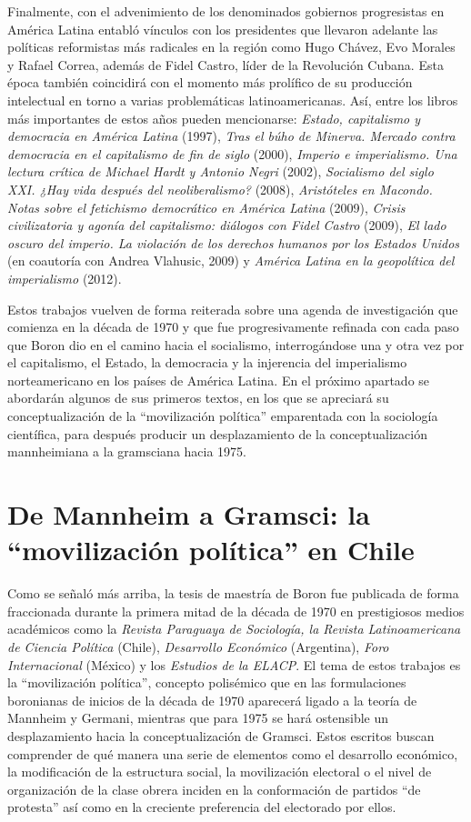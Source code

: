 Finalmente, con el advenimiento de los denominados gobiernos progresistas en América Latina entabló vínculos con los presidentes que llevaron adelante las políticas reformistas más radicales en la región como Hugo Chávez, Evo Morales y Rafael Correa, además de Fidel Castro, líder de la Revolución Cubana. Esta época también coincidirá con el momento más prolífico de su producción intelectual en torno a varias problemáticas latinoamericanas. Así, entre los libros más importantes de estos años pueden mencionarse: \emph{Estado, capitalismo y democracia en América Latina} (1997), \emph{Tras el búho de Minerva. Mercado contra democracia en el capitalismo de fin de siglo} (2000), \emph{Imperio e imperialismo. Una lectura crítica de Michael Hardt y Antonio Negri} (2002), \emph{Socialismo del siglo XXI. ¿Hay vida después del neoliberalismo?} (2008), \emph{Aristóteles en Macondo. Notas sobre el fetichismo democrático en América Latina} (2009), \emph{Crisis civilizatoria y agonía del capitalismo: diálogos con Fidel Castro} (2009), \emph{El lado oscuro del imperio. La violación de los derechos humanos por los Estados Unidos} (en coautoría con Andrea Vlahusic, 2009) y \emph{América Latina en la geopolítica del imperialismo} (2012).

Estos trabajos vuelven de forma reiterada sobre una agenda de investigación que comienza en la década de 1970 y que fue progresivamente refinada con cada paso que Boron dio en el camino hacia el socialismo, interrogándose una y otra vez por el capitalismo, el Estado, la democracia y la injerencia del imperialismo norteamericano en los países de América Latina. En el próximo apartado se abordarán algunos de sus primeros textos, en los que se apreciará su conceptualización de la ``movilización política'' emparentada con la sociología científica, para después producir un desplazamiento de la conceptualización mannheimiana a la gramsciana hacia 1975.

\section{De Mannheim a Gramsci: la ``movilización política'' en Chile}

Como se señaló más arriba, la tesis de maestría de Boron fue publicada de forma fraccionada durante la primera mitad de la década de 1970 en prestigiosos medios académicos como la \emph{Revista Paraguaya de Sociología, la Revista Latinoamericana de Ciencia Política} (Chile), \emph{Desarrollo Económico} (Argentina), \emph{Foro Internacional} (México) y los \emph{Estudios de la ELACP}. El tema de estos trabajos es la ``movilización política'', concepto polisémico que en las formulaciones boronianas de inicios de la década de 1970 aparecerá ligado a la teoría de Mannheim y Germani, mientras que para 1975 se hará ostensible un desplazamiento hacia la conceptualización de Gramsci. Estos escritos buscan comprender de qué manera una serie de elementos como el desarrollo económico, la modificación de la estructura social, la movilización electoral o el nivel de organización de la clase obrera inciden en la conformación de partidos ``de protesta'' así como en la creciente preferencia del electorado por ellos.

